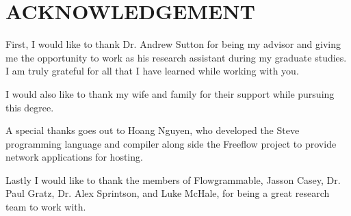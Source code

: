 \chapter*{ACKNOWLEDGEMENT}

First, I would like to thank Dr. Andrew Sutton for being my advisor and giving
me the opportunity to work as his research assistant during my graduate studies.
I am truly grateful for all that I have learned while working with you.

I would also like to thank my wife and family for their support while pursuing
this degree.

A special thanks goes out to Hoang Nguyen, who developed the Steve programming
language and compiler along side the Freeflow project to provide network applications for hosting.

Lastly I would like to thank the members of Flowgrammable, Jasson Casey, Dr.
Paul Gratz, Dr. Alex Sprintson, and Luke McHale, for being a great research
team to work with.
